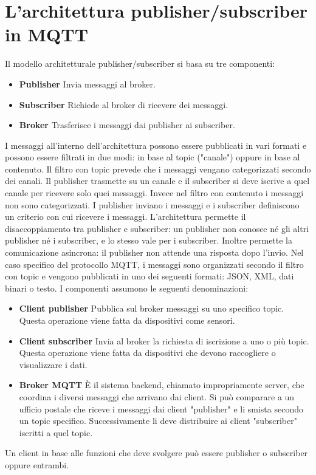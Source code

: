 \section{L'architettura publisher/subscriber in MQTT}
\label{sec:mqtt-architettura}
Il modello architetturale publisher/subscriber si basa su tre componenti:
\begin{itemize}
    \item \textbf{Publisher}\newline
    Invia messaggi al broker.
    \item \textbf{Subscriber}\newline
    Richiede al broker di ricevere dei messaggi.
    \item \textbf{Broker}\newline
    Trasferisce i messaggi dai publisher ai subscriber.
\end{itemize}
I messaggi all'interno dell'architettura possono essere pubblicati in vari formati e possono essere filtrati in due modi:
in base al topic ("canale") oppure in base al contenuto.
Il filtro con topic prevede che i messaggi vengano categorizzati secondo dei canali.
Il publisher trasmette su un canale e il subscriber si deve iscrive a quel canale per ricevere solo quei messaggi.
Invece nel filtro con contenuto i messaggi non sono categorizzati.
I publisher inviano i messaggi e i subscriber definiscono un criterio con cui ricevere i messaggi. \newline
L'architettura permette il disaccoppiamento tra publisher e subscriber:
un publisher non conosce né gli altri publisher né i subscriber, e lo stesso vale per i subscriber.
Inoltre permette la comunicazione asincrona: il publisher non attende una risposta dopo l'invio.\newline
Nel caso specifico del protocollo MQTT, i messaggi sono organizzati secondo il filtro con topic
e vengono pubblicati in uno dei seguenti formati: JSON, XML, dati binari o testo.
I componenti assumono le seguenti denominazioni:
\begin{itemize}
    \item \textbf{Client publisher}\newline
    Pubblica sul broker messaggi su uno specifico topic.
    Questa operazione viene fatta da dispositivi come sensori.
    \item \textbf{Client subscriber}\newline
    Invia al broker la richiesta di iscrizione a uno o più topic.
    Questa operazione viene fatta da dispositivi che devono raccogliere o visualizzare i dati.
    \item \textbf{Broker MQTT}\newline
    È il sistema backend, chiamato impropriamente server, che coordina i diversi messaggi che arrivano dai client.
    Si può comparare a un ufficio postale che riceve i messaggi dai client "publisher" e li smista secondo un topic specifico.
    Successivamente li deve distribuire ai client "subscriber" iscritti a quel topic.
\end{itemize}
Un client in base alle funzioni che deve svolgere può essere publisher o subscriber oppure entrambi.


